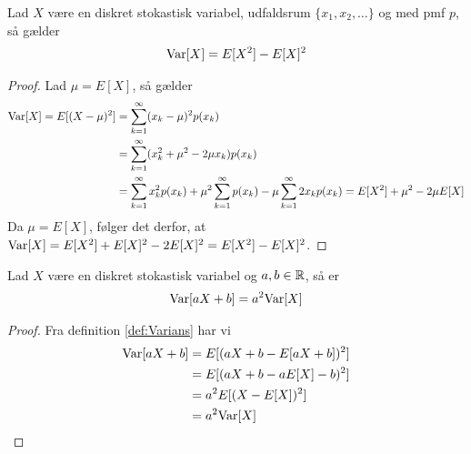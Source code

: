 \begin{cor} \label{cor:VariansIForholdTilForventedVærdi} %
    Lad $X$ være en diskret stokastisk variabel, udfaldsrum $\{x_1, x_2, \ldots\}$ og med pmf $p$, så gælder
    \begin{align*}
      \textnormal{Var}[X]=E[X^2]-E[X]^2
    \end{align*}
\end{cor}
\begin{proof}
    Lad $\mu = E[X]$, så gælder
    \begin{align*}
        \textnormal{Var}[X] = E[(X - \mu)^2] &= \sum^\infty_{k = 1} (x_k - \mu)^2 p(x_k)\\
        &= \sum^\infty_{k = 1} (x_k^2 + \mu^2 - 2\mu x_k)p(x_k) \\
        &= \sum^\infty_{k = 1} x_k^2 p(x_k) + \mu^2 \sum^\infty_{k = 1} p(x_k) - \mu \sum^\infty_{k = 1} 2x_k p(x_k) = E[X^2] + \mu^2 - 2\mu E[X]
    \end{align*}
    Da $\mu = E[X]$, følger det derfor, at $\textnormal{Var}[X] = E[X^2] + E[X]^2 - 2E[X]^2 = E[X^2] - E[X]^2$.
\end{proof}




\begin{prop}\label{prop:prop2.15} %
Lad $X$ være en diskret stokastisk variabel og $a, b\in \mathbb{R}$, så er
\begin{align*}
    \textnormal{Var}[aX+b]=a^2\textnormal{Var}[X]
\end{align*}
\end{prop}
\begin{proof}
Fra definition \ref{def:Varians} har vi
    \begin{align*}
        \textnormal{Var}[aX+b]&=E[(aX+b-E[aX+b])^2]\\
        &=E[(aX+b-aE[X]-b)^2]\\
        &=a^2E[(X-E[X])^2]\\
        &=a^2\textnormal{Var}[X]
    \end{align*}
\end{proof}
